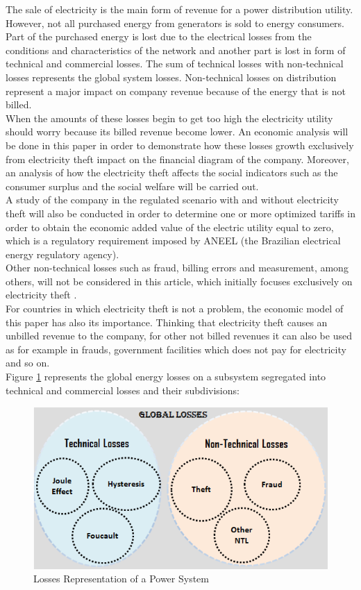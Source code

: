 \documentclass[preprint,12pt]{elsarticle}
\begin{document}
The sale of electricity is the main form of revenue for a power distribution utility. However, not all purchased energy from generators is sold to energy consumers. Part of the purchased energy is lost due to the electrical losses from the conditions and characteristics of the network and another part is lost in form of technical and commercial losses. The sum of technical losses with non-technical losses represents the global system losses. Non-technical losses on distribution represent a major impact on company revenue because of the energy that is not billed.\\
When the amounts of these losses begin to get too high the electricity utility should worry because its billed revenue become lower. An economic analysis will be done in this paper in order to demonstrate how these losses growth exclusively from electricity theft impact on the financial diagram of the company.
Moreover, an analysis of how the electricity theft affects the social indicators such as the consumer surplus and the social welfare will be carried out. \\
A study of the company in the regulated scenario with and without electricity theft will also be conducted in order to determine one or more optimized tariffs in order to obtain the economic added value of the electric utility equal to zero, which is a regulatory requirement imposed by ANEEL (the Brazilian electrical energy regulatory agency).\\
Other non-technical losses such as fraud, billing errors and measurement, among others, will not be considered in this article, which initially focuses exclusively on electricity theft \citet{Penin2008CombatPortuguese} \citet{Smith2004ElectricityAnalysis} \citet{Amin2015Game-theoreticInfrastructure}.\\
For countries in which electricity theft is not a problem, the economic model of this paper has also its importance. Thinking that electricity theft causes an unbilled revenue to the company, for other not billed revenues it can also be used as for example in frauds, government facilities which does not pay for electricity and so on.\\
Figure \ref{Fig1} represents the global energy losses on a subsystem segregated into technical and commercial losses and their subdivisions:\\

\begin{figure}[h]
\centering\includegraphics[width=0.8\linewidth]{Fig1.png}
\caption{Losses Representation of a Power System}
\label{Fig1}
\end{figure}
\end{document}
